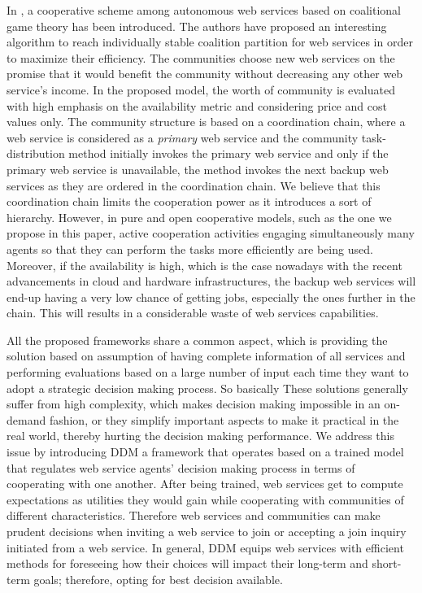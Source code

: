 In \cite{10.1109/TSC.2012.12}, a cooperative scheme among
autonomous web services based on coalitional game theory has been
introduced. The authors have proposed an interesting algorithm to
reach individually stable coalition partition for web services in
order to maximize their efficiency. The communities choose new web
services on the promise that it would benefit the community
without decreasing any other web service's income. In the proposed
model, the worth of community is evaluated with high emphasis on
the availability metric and considering price and cost values
only. The community structure is based on a coordination chain,
where a web service is considered as a \emph{primary} web service
and the community task-distribution method initially invokes the
primary web service and only if the primary web service is
unavailable, the method invokes the next backup web services as
they are ordered in the coordination chain. We believe that this
coordination chain limits the cooperation power as it introduces a
sort of hierarchy. However, in pure and open cooperative models,
such as the one we propose in this paper, active cooperation
activities engaging simultaneously many agents so that they can
perform the tasks more efficiently are being used. Moreover, if
the availability is high, which is the case nowadays with the
recent advancements in cloud and hardware infrastructures, the
backup web services will end-up having a very low chance of
getting jobs, especially the ones further in the chain. This will
results in a considerable waste of web services capabilities.

All the proposed frameworks share a common aspect, which is providing the solution based on assumption of having complete information of all services and performing evaluations based on a large number of input each time they want to adopt a strategic decision making process.
So basically These solutions generally suffer from high complexity, which makes decision making impossible in an on-demand fashion, or they simplify important aspects to make it practical in the real world, thereby hurting the decision making performance. We address this issue by introducing DDM a framework that operates based on a trained model that regulates web service agents' decision making process in terms of cooperating with one another. After being trained, web services get to compute expectations as utilities they would gain while cooperating with communities of different characteristics. Therefore web services and communities can make prudent decisions when inviting a web service to join or accepting a join inquiry initiated from a web service. In general, DDM equips web services with efficient methods for foreseeing how their choices will impact their long-term and short-term goals; therefore, opting for best decision available.





